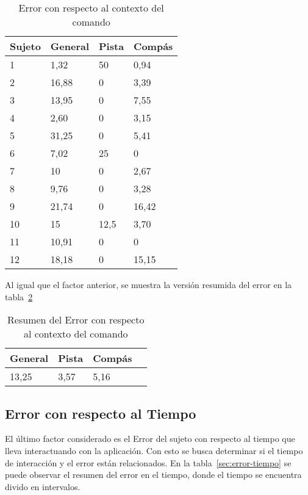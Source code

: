 \begin{table}[H]
\centering
\footnotesize
\begin{tabular}{|p{1.6cm}|p{1.6cm}|p{1.6cm}|p{1.6cm}|}
\hline
    Sujeto & General & Pista & Comp\'as \\
    \hline
1 & 1,32  & 50     & 0,94 \\
2 & 16,88 & 0      & 3,39 \\
3 & 13,95 & 0      & 7,55 \\
4 & 2,60 & 0      & 3,15 \\
5 & 31,25 & 0      & 5,41 \\
6 & 7,02 & 25     & 0 \\
7 & 10     & 0      & 2,67 \\
8 & 9,76 & 0      & 3,28 \\
9 & 21,74 & 0      & 16,42 \\
10 & 15     & 12,5 & 3,70 \\
11 & 10,91 & 0      & 0 \\
12 & 18,18 & 0      & 15,15 \\
    \hline
\end{tabular}
\caption{Error con respecto al contexto del comando}
\label{sec:error-contexto}
\end{table}

Al igual que el factor anterior, se muestra la versi\'on resumida del error en la tabla~\ref{sec:error-contexto-resumen}

\begin{table}[H]
\centering
\footnotesize
\begin{tabular}{|p{1.6cm}|p{1.6cm}|p{1.6cm}|p{1.6cm}|}
\hline
    General & Pista & Comp\'as \\
    \hline
    13,25 & 3,57 & 5,16 \\
    \hline
\end{tabular}
\caption{Resumen del Error con respecto al contexto del comando}
\label{sec:error-contexto-resumen}
\end{table}

\subsection{Error con respecto al Tiempo}

El \'ultimo factor considerado es el Error del sujeto con respecto al tiempo que lleva interactuando con la aplicaci\'on. Con esto
se busca determinar si el tiempo de interacci\'on y el error est\'an relacionados. En la tabla~\ref{sec:error-tiempo} se puede observar
el resumen del error en el tiempo, donde el tiempo se encuentra divido en intervalos.



